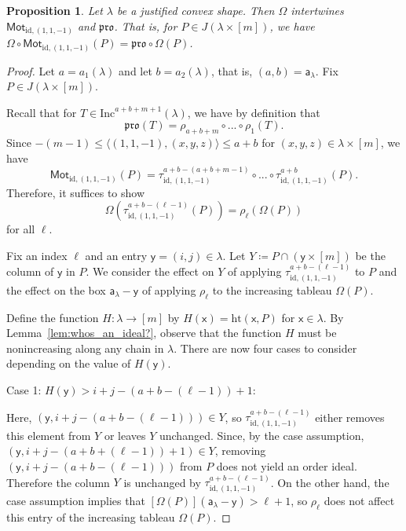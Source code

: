\documentclass[12pt]{amsart}
\newcommand{\x}{\ensuremath{\mathsf{x}}}
\newcommand{\y}{\ensuremath{\mathsf{y}}}
\newcommand{\aaa}{\ensuremath{\mathsf{a}}}
\newtheorem{proposition}[theorem]{Proposition}
\theoremstyle{definition}
\theoremstyle{remark}
\numberwithin{equation}{section}
\newcommand{\inc}{\ensuremath{\mathrm{Inc}}}
\newcommand{\pro}{\mathfrak{pro}}
\newcommand{\mot}{\ensuremath{\mathsf{Mot}}}
\begin{document}
\begin{proposition}\label{prop:equivariant}
Let $\lambda$ be a justified convex shape. Then $\Omega$ intertwines $\mot_{\text{id},(1,1,-1)}$ and $\pro$. That is, for $P \in J(\lambda \times [m])$, we have $\Omega \circ \mot_{\text{id},(1,1,-1)}(P) = \pro \circ \Omega(P)$.
\end{proposition}
\begin{proof}
Let $a = a_1(\lambda)$ and let $b = a_2(\lambda)$, that is, $(a,b) = \aaa_{\lambda}$.  Fix $P \in J(\lambda \times [m])$. 

Recall that for $T \in \inc^{a+b+m+1}(\lambda)$, we have by definition that
\begin{equation*}
\pro(T) = \rho_{a+b+m} \circ  ... \circ \rho_1(T).
\end{equation*}
Since $-(m-1) \leq \langle (1,1,-1),(x,y,z) \rangle \leq a+b$ for $(x,y,z) \in \lambda \times [m]$, we have
\begin{equation*}
\mot_{\text{id},(1,1,-1)}(P) = \tau^{a+b-(a+b+m-1)}_{\text{id},(1,1,-1)} \circ ... \circ \tau^{a+b}_{\text{id},(1,1,-1)}(P).
\end{equation*}
Therefore, it suffices to show 
\begin{equation*}
\Omega \left(\tau^{a+b-(\ell-1)}_{\text{id},(1,1,-1)}(P) \right) = \rho_\ell \left(\Omega(P)\right)
\end{equation*}
for all $\ell$. 

Fix an index $\ell$ and an entry $\y = (i,j) \in \lambda$. Let $Y \coloneqq P \cap ( \y \times [m] )$ be the column of $\y$ in $P$. We consider the effect on $Y$ of applying $\tau^{a+b-(\ell-1)}_{\text{id},(1,1,-1)}$ to $P$  and the effect on the box $\aaa_\lambda - \y$ of applying $\rho_\ell$ to the increasing tableau $\Omega(P)$. 

Define the function $H : \lambda \to [m]$ by $H(\x) = \text{ht}(\x,P)$ for $\x \in \lambda$.
By Lemma~\ref{lem:whos_an_ideal?}, observe that the function $H$ must be nonincreasing along any chain in $\lambda$. 
There are now four cases to consider depending on the value of $H(\y)$.

\medskip
\noindent
{\sf Case 1: $H(\y) > i+j-(a+b-(\ell-1))+1$:} 

Here, $(\y,i+j-(a+b-(\ell-1))) \in Y$, so $\tau^{a+b-(\ell-1)}_{\text{id},(1,1,-1)}$ either removes this element from $Y$ or leaves $Y$ unchanged. Since, by the case assumption, $(\y,i+j-(a+b+(\ell-1))+1) \in Y$, removing $(\y,i+j-(a+b-(\ell-1)))$ from $P$ does not yield an order ideal. Therefore the column $Y$ is unchanged by $\tau^{a+b-(\ell-1)}_{\text{id},(1,1,-1)}$. On the other hand, the case assumption implies that $[\Omega(P)](\aaa_\lambda - \y) > \ell + 1$, so $\rho_{\ell}$ does not affect this entry of the increasing tableau $\Omega(P)$. 


\end{proof}
\end{document}
